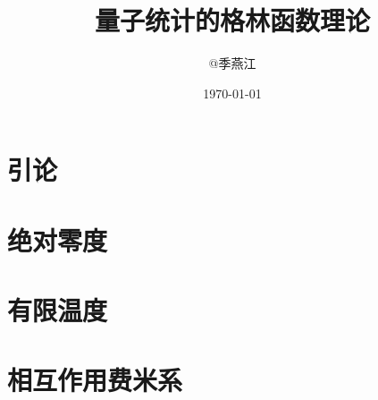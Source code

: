 \documentclass[twoside,b5paper,11pt]{report}
\begin{document}
\pagestyle{headings}

\title{量子统计的格林函数理论}
\author {@季燕江}

\date{\today}
\maketitle

\newpage
\tableofcontents \setcounter{tocdepth}{1}
\newpage



\chapter{引论}









\chapter{绝对零度}











\chapter{有限温度}







\chapter{相互作用费米系}





%


%
\end{document}
